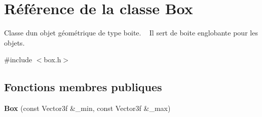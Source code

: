 \hypertarget{class_box}{}\section{Référence de la classe Box}
\label{class_box}


Classe d\textquotesingle{}un objet géométrique de type boite. ~\newline
 Il sert de boite englobante pour les objets.  




{\ttfamily \#include $<$box.\+h$>$}

\subsection*{Fonctions membres publiques}
\begin{DoxyCompactItemize}
\item 
\hypertarget{class_box_aa232abb63b2b72d93791c74a96ac7de9}{}{\bfseries Box} (const Vector3f \&\+\_\+min, const Vector3f \&\+\_\+max)\label{class_box_aa232abb63b2b72d93791c74a96ac7de9}


\end{DoxyCompactItemize}
